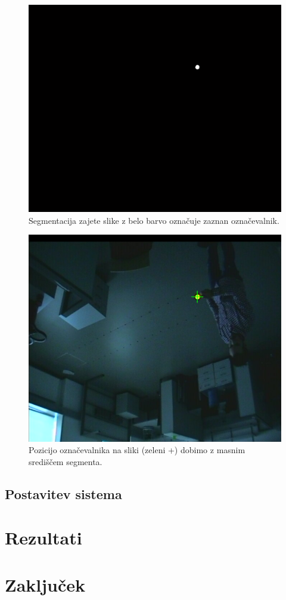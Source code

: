 \documentclass[a4paper, 12pt]{book}
\begin{document}
\begin{figure}[H]
\centering
\includegraphics[width=\textwidth,height=\textheight,keepaspectratio]{segmented.png}
\caption{Segmentacija zajete slike z belo barvo označuje zaznan označevalnik.}
\end{figure}

\begin{figure}[H]
\centering
\includegraphics[width=\textwidth,height=\textheight,keepaspectratio]{detected.png}
\caption{Pozicijo označevalnika na sliki (zeleni +) dobimo z masnim središčem segmenta.}
\end{figure}

\section{Postavitev sistema}

\chapter{Rezultati}

\chapter{Zaključek}

{}

\end{document}
